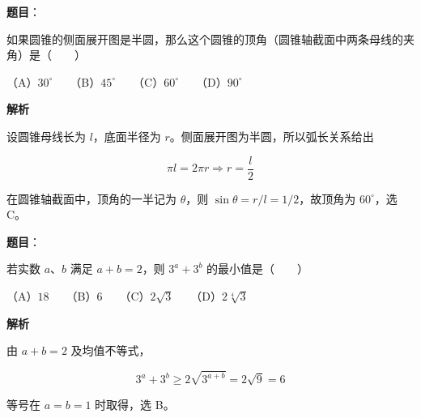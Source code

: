 \begin{answer}

\textbf{题目}：

如果圆锥的侧面展开图是半圆，那么这个圆锥的顶角（圆锥轴截面中两条母线的夹角）是\mbox{（　　）}

（A）$30^\circ$　　（B）$45^\circ$　　（C）$60^\circ$　　（D）$90^\circ$

\textbf{解析}

设圆锥母线长为 $l$，底面半径为 $r$。侧面展开图为半圆，所以弧长关系给出

\nopagebreak[4]
\[
\pi l=2\pi r
\Longrightarrow r=\frac l2
\]

在圆锥轴截面中，顶角的一半记为 $\theta$，则 $\sin\theta=r/l=1/2$，故顶角为 $60^\circ$，选 C。


\end{answer}
\begin{answer}

\textbf{题目}：

若实数 $a\text{、}b$ 满足 $a+b=2$，则 $3^a+3^b$ 的最小值是\mbox{（　　）}

（A）$18$　　（B）$6$　　（C）$2\sqrt3$　　（D）$2\sqrt[4]{3}$

\textbf{解析}

由 $a+b=2$ 及均值不等式，

\nopagebreak[4]
\[
3^a+3^b\ge2\sqrt{3^{a+b}}=2\sqrt9=6
\]

等号在 $a=b=1$ 时取得，选 B。


\end{answer}
